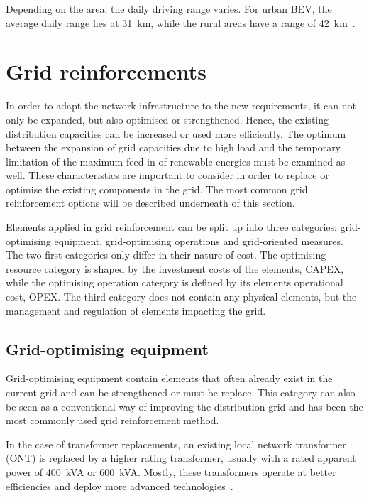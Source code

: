 Depending on the area, the daily driving range varies. For urban BEV, the average daily range lies at 31~km, while the rural areas have a range of 42~km~\cite{VDEFNN_2021}.




\section{Grid reinforcements}
In order to adapt the network infrastructure to the new requirements, it can not only be expanded, but also optimised or strengthened. Hence, the existing distribution capacities can be increased or used more efficiently. The optimum between the expansion of grid capacities due to high load and the temporary limitation of the maximum feed-in of renewable energies must be examined as well. These characteristics are important to consider in order to replace or optimise the existing components in the grid. The most common grid reinforcement options will be described underneath of this section. 

Elements applied in grid reinforcement can be split up into three categories: grid-optimising equipment, grid-optimising operations and grid-oriented measures. The two first categories only differ in their nature of cost. The optimising resource category is shaped by the investment costs of the elements, CAPEX, while the optimising operation category is defined by its elements operational cost, OPEX. The third category does not contain any physical elements, but the management and regulation of elements impacting the grid. 

\subsection{Grid-optimising equipment}

Grid-optimising equipment contain elements that often already exist in the current grid and can be strengthened or must be replace. This category can also be seen as a conventional way of improving the distribution grid and has been the most commonly used grid reinforcement method. 


In the case of transformer replacements, an existing local network transformer (ONT) is replaced by a higher rating transformer, usually with a rated apparent power of 400~kVA or 600~kVA. Mostly, these transformers operate at better efficiencies and deploy more advanced technologies~\cite{noauthor_dena_nodate}. 

